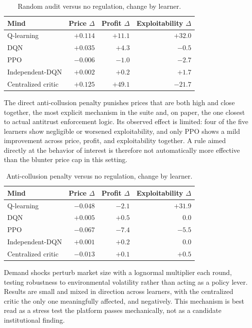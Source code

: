 \documentclass[11pt]{article}
\begin{document}
\begin{table}[h]
\centering
\begin{tabular}{lrrr}
\toprule
Mind & Price \(\Delta\) & Profit \(\Delta\) & Exploitability \(\Delta\) \\
\midrule
Q-learning & \(+0.114\) & \(+11.1\) & \(+32.0\) \\
DQN & \(+0.035\) & \(+4.3\) & \(-0.5\) \\
PPO & \(-0.006\) & \(-1.0\) & \(-2.7\) \\
Independent-DQN & \(+0.002\) & \(+0.2\) & \(+1.7\) \\
Centralized critic & \(+0.125\) & \(+49.1\) & \(-21.7\) \\
\bottomrule
\end{tabular}
\caption{Random audit versus no regulation, change by learner.}
\label{tab:pricing-audit}
\end{table}

The direct anti-collusion penalty punishes prices that are both high and close
together, the most explicit mechanism in the suite and, on paper, the one
closest to actual antitrust enforcement logic. Its observed effect is limited:
four of the five learners show negligible or worsened exploitability, and only
PPO shows a mild improvement across price, profit, and exploitability together.
A rule aimed directly at the behavior of interest is therefore not
automatically more effective than the blunter price cap in this setting.

\begin{table}[h]
\centering
\begin{tabular}{lrrr}
\toprule
Mind & Price \(\Delta\) & Profit \(\Delta\) & Exploitability \(\Delta\) \\
\midrule
Q-learning & \(-0.048\) & \(-2.1\) & \(+31.9\) \\
DQN & \(+0.005\) & \(+0.5\) & \(0.0\) \\
PPO & \(-0.067\) & \(-7.4\) & \(-5.5\) \\
Independent-DQN & \(+0.001\) & \(+0.2\) & \(0.0\) \\
Centralized critic & \(-0.013\) & \(+0.1\) & \(+0.5\) \\
\bottomrule
\end{tabular}
\caption{Anti-collusion penalty versus no regulation, change by learner.}
\label{tab:pricing-anticollusion}
\end{table}

Demand shocks perturb market size with a lognormal multiplier each round,
testing robustness to environmental volatility rather than acting as a policy
lever. Results are small and mixed in direction across learners, with the
centralized critic the only one meaningfully affected, and negatively. This
mechanism is best read as a stress test the platform passes mechanically, not
as a candidate institutional finding.
\end{document}

